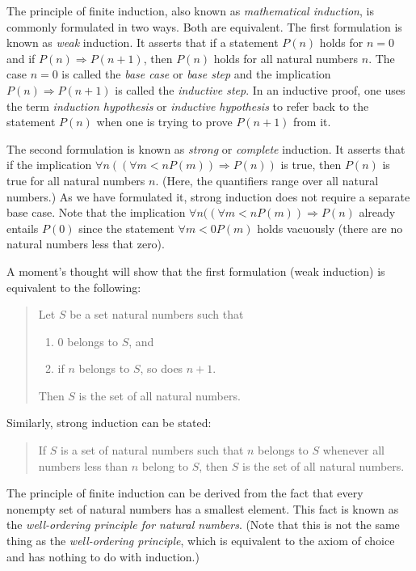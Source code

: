 \documentclass[12pt]{article}
\begin{document}


The principle of finite induction, also known as \emph{mathematical induction}, is commonly formulated in two ways. Both are equivalent. The first formulation is known as \emph{weak} induction. It asserts that if a statement $P(n)$ holds for $n=0$ and if $P(n)\Rightarrow P(n+1)$, then $P(n)$ holds for all natural numbers $n$. The case $n=0$ is called the \emph{base case} or \emph{base step} and the implication $P(n)\Rightarrow P(n+1)$ is called the \emph{inductive step}. In an inductive proof, one uses the term \emph{induction hypothesis} or \emph{inductive hypothesis} to refer back to the statement $P(n)$ when one is trying to prove $P(n+1)$ from it.

The second formulation is known as \emph{strong} or \emph{complete} induction. It asserts that if the implication $\forall n((\forall m < n P(m))\Rightarrow P(n))$ is true, then $P(n)$ is true for all natural numbers $n$. (Here, the quantifiers range over all natural numbers.) As we have formulated it, strong induction does not require a separate base case. Note that the implication $\forall n((\forall m < n P(m))\Rightarrow P(n)$ already entails $P(0)$ since the statement $\forall m<0 P(m)$ holds vacuously (there are no natural numbers less that zero). 

A moment's thought will show that the first formulation (weak induction) is equivalent to the following:
\begin{quote}
Let $S$ be a set natural numbers such that
\begin{enumerate}
\item $0$ belongs to $S$, and
\item if $n$ belongs to $S$, so does $n+1$.
\end{enumerate}
Then $S$ is the set of all natural numbers.
\end{quote}

Similarly, strong induction can be stated:
\begin{quote}
If $S$ is a set of natural numbers such that $n$ belongs to $S$ whenever all numbers less than $n$ belong to $S$, then $S$ is the set of all natural numbers.
\end{quote}

The principle of finite induction can be derived from the fact that every nonempty set of natural numbers has a smallest element. This fact is known as the \emph{well-ordering principle for natural numbers}. (Note that this is not the same thing as the \emph{well-ordering principle}, which is equivalent to the axiom of choice and has nothing to do with induction.)
\end{document}
